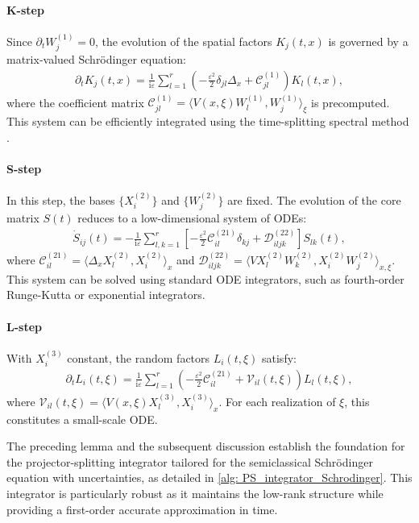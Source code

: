 \documentclass[preprint,11pt]{elsarticle}
\begin{document}
\paragraph{K-step} Since $\partial_t W_j^{(1)}=0$, the evolution of the spatial factors $K_j(t,x)$ is governed by a matrix-valued Schrödinger equation:
\begin{align*}
    \partial_t K_j(t,x) = \frac{1}{\mathrm{i}\varepsilon} \sum_{l=1}^r \left( -\frac{\varepsilon^2}{2} \delta_{jl} \Delta_x + \mathcal{C}_{jl}^{(1)} \right) K_l(t,x), 
\end{align*}
where the coefficient matrix $\mathcal{C}_{jl}^{(1)} = \langle V(x,\xi) W_l^{(1)},W_j^{(1)}\rangle_{\xi}$ is precomputed. This system can be efficiently integrated using the time-splitting spectral method \cite{baoTimeSplittingSpectralApproximations2002}.

\paragraph{S-step} In this step, the bases $\{X_i^{(2)}\}$ and $\{W_j^{(2)}\}$ are fixed. The evolution of the core matrix $S(t)$ reduces to a low-dimensional system of ODEs:
\begin{align*}
    \dot{S}_{ij}(t) = -\frac{1}{\mathrm{i}\varepsilon} \sum_{l,k=1}^r \left[ -\frac{\varepsilon^2}{2} \mathcal{C}_{il}^{(21)} \delta_{kj} + \mathcal{D}_{iljk}^{(22)} \right] S_{lk}(t),
\end{align*}
where $\mathcal{C}_{il}^{(21)} = \langle \Delta_x X_l^{(2)}, X_i^{(2)} \rangle_x$ and $\mathcal{D}_{iljk}^{(22)} = \langle V X_l^{(2)} W_k^{(2)}, X_i^{(2)} W_j^{(2)} \rangle_{x,\xi}$. This system can be solved using standard ODE integrators, such as fourth-order Runge-Kutta or exponential integrators.

\paragraph{L-step} With $X_i^{(3)}$ constant, the random factors $L_i(t, \xi)$ satisfy:
\begin{align*}
    \partial_t L_i(t,\xi) = \frac{1}{\mathrm{i}\varepsilon} \sum_{l=1}^r \left( -\frac{\varepsilon^2}{2} \mathcal{C}_{il}^{(21)} + \mathcal{V}_{il}(t, \xi) \right) L_l(t,\xi),
\end{align*}
where $\mathcal{V}_{il}(t, \xi) = \langle V(x,\xi) X_l^{(3)}, X_i^{(3)} \rangle_x$. For each realization of $\xi$, this constitutes a small-scale ODE.

The preceding lemma and the subsequent discussion establish the foundation for the projector-splitting integrator tailored for the semiclassical Schrödinger equation with uncertainties, as detailed in \cref{alg: PS_integrator_Schrodinger}. This integrator is particularly robust as it maintains the low-rank structure while providing a first-order accurate approximation in time.
\end{document}
